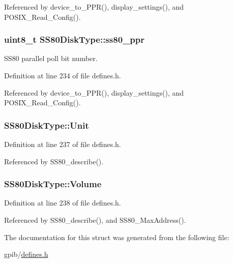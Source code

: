 Referenced by device\+\_\+to\+\_\+\+P\+P\+R(), display\+\_\+settings(), and P\+O\+S\+I\+X\+\_\+\+Read\+\_\+\+Config().

\subsubsection[{\texorpdfstring{ss80\+\_\+ppr}{ss80_ppr}}]{\setlength{\rightskip}{0pt plus 5cm}uint8\+\_\+t S\+S80\+Disk\+Type\+::ss80\+\_\+ppr}\hypertarget{structSS80DiskType_a93cbe7ea84a0d2d33ecc4eaae8367bd5}{}\label{structSS80DiskType_a93cbe7ea84a0d2d33ecc4eaae8367bd5}


S\+S80 parallel poll bit number. 



Definition at line 234 of file defines.\+h.



Referenced by device\+\_\+to\+\_\+\+P\+P\+R(), display\+\_\+settings(), and P\+O\+S\+I\+X\+\_\+\+Read\+\_\+\+Config().

\subsubsection[{\texorpdfstring{Unit}{Unit}}]{ S\+S80\+Disk\+Type\+::\+Unit}\hypertarget{structSS80DiskType_a53779c62a77383b446ab9097ed70481d}{}\label{structSS80DiskType_a53779c62a77383b446ab9097ed70481d}


Definition at line 237 of file defines.\+h.



Referenced by S\+S80\+\_\+describe().

\subsubsection[{\texorpdfstring{Volume}{Volume}}]{ S\+S80\+Disk\+Type\+::\+Volume}\hypertarget{structSS80DiskType_a34eaa5702599d69fcd7c2fc7e13a2256}{}\label{structSS80DiskType_a34eaa5702599d69fcd7c2fc7e13a2256}


Definition at line 238 of file defines.\+h.



Referenced by S\+S80\+\_\+describe(), and S\+S80\+\_\+\+Max\+Address().



The documentation for this struct was generated from the following file\+:\begin{DoxyCompactItemize}
\item 
gpib/\hyperlink{defines_8h}{defines.\+h}\end{DoxyCompactItemize}
